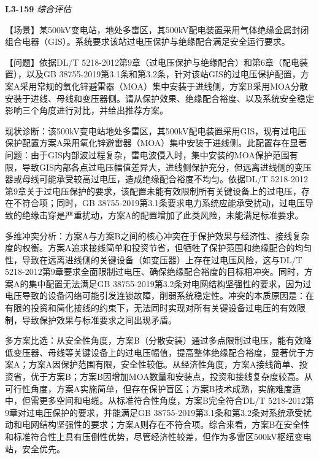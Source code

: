 \documentclass[12pt,a4paper]{ctexart}
\begin{document}
\noindent\textbf{L3-159} \hfill \textit{综合评估}
\begin{description}[leftmargin=1.5em,style=nextline,font=\normalfont]
  \item[Q:] 【场景】某500kV变电站，地处多雷区，其500kV配电装置采用气体绝缘金属封闭组合电器（GIS）。系统要求该站过电压保护与绝缘配合满足安全运行要求。

【问题】依据DL/T 5218-2012第9章（过电压保护与绝缘配合）和第6章（配电装置），以及GB 38755-2019第3.1条和第3.2条，针对该站GIS的过电压保护配置，方案A采用常规的氧化锌避雷器（MOA）集中安装于进线侧，方案B采用MOA分散安装于进线、母线和变压器侧。请从保护效果、绝缘配合裕度、以及系统安全稳定影响三个角度进行对比，并给出推荐方案。
  \item[A:] 现状诊断：该500kV变电站地处多雷区，其500kV配电装置采用GIS，现有过电压保护配置方案A采用氧化锌避雷器（MOA）集中安装于进线侧。此配置存在显著问题：由于GIS内部波过程复杂，雷电波侵入时，集中安装的MOA保护范围有限，导致GIS内部各点过电压幅值差异大，进线侧保护充分，但远离进线侧的变压器或母线可能承受较高过电压，造成绝缘配合裕度不均匀。依据DL/T 5218-2012第9章关于过电压保护的要求，该配置未能有效限制所有关键设备上的过电压，存在不符合项；同时，GB 38755-2019第3.1条要求电力系统应能承受扰动，过电压导致的绝缘击穿是严重扰动，方案A的配置增加了此类风险，未能满足标准要求。

多维冲突分析：方案A与方案B之间的核心冲突在于保护效果与经济性、接线复杂度的权衡。方案A追求接线简单和投资节省，但牺牲了保护范围和绝缘配合的均匀性，导致在远离进线侧的关键设备（如变压器）上存在过电压风险，这与DL/T 5218-2012第9章要求全面限制过电压、确保绝缘配合裕度的目标相冲突。同时，方案A的集中配置无法满足GB 38755-2019第3.2条对电网结构坚强性的要求，因为过电压导致的设备闪络可能引发连锁故障，削弱系统稳定性。冲突的本质原因是：在有限的投资和简化接线的约束下，无法同时实现对所有关键设备过电压的有效限制，导致保护效果与标准要求之间出现矛盾。

多方案比选：从安全性角度，方案B（分散安装）通过多点限制过电压，能有效降低变压器、母线等关键设备上的过电压幅值，提高整体绝缘配合裕度，显著优于方案A；方案A因保护范围有限，安全性较低。从经济性角度，方案A接线简单、投资省，优于方案B；方案B因增加MOA数量和安装点，投资和接线复杂度较高。从可行性角度，方案A实施简单，但存在保护盲区；方案B技术成熟，实施难度适中，但需更多空间和电缆。从标准符合性角度，方案B完全符合DL/T 5218-2012第9章对过电压保护的要求，并能满足GB 38755-2019第3.1条和第3.2条对系统承受扰动和电网结构坚强性的要求；方案A则存在不符合项。综合来看，方案B在安全性和标准符合性上具有压倒性优势，尽管经济性较差，但作为多雷区500kV枢纽变电站，安全优先。


\end{description}
\end{document}
